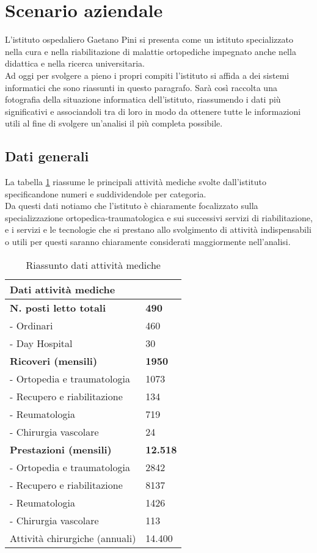 \newpage

\section{Scenario aziendale} \label{ref:scenario}
	L'istituto ospedaliero Gaetano Pini si presenta come un istituto specializzato nella cura e nella riabilitazione di malattie ortopediche impegnato anche nella didattica e nella ricerca universitaria. \\Ad oggi per svolgere a pieno i propri compiti l'istituto si affida a dei sistemi informatici che sono riassunti in questo paragrafo.
	Sarà così raccolta una fotografia della situazione informatica dell'istituto, riassumendo i dati più significativi e associandoli tra di loro in modo da ottenere tutte le informazioni utili al fine di svolgere un'analisi il più completa possibile.
	
	\subsection{Dati generali}
	La tabella \ref{tab:attivitaMediche} riassume le principali attività mediche svolte dall'istituto specificandone numeri e suddividendole per categoria. \\
	Da questi dati notiamo che l’istituto è chiaramente focalizzato sulla specializzazione ortopedica-traumatologica e sui successivi servizi di riabilitazione, e i servizi e le tecnologie che si prestano allo svolgimento di attività indispensabili o utili per questi saranno chiaramente considerati maggiormente nell'analisi. \\
	\begin{table}[h] 
		\centering
		\begin{tabular}{|l|l|}
			\hline
			\rowcolor[HTML]{EFEFEF} 
			\textbf{Dati attività mediche} & \\ \hline
			\textbf{N. posti letto totali}					& \textbf{490} \\
			- Ordinari 							& 460 \\
			- Day Hospital 					& 30 	\\ \hline
			\textbf{Ricoveri (mensili)}  				& \textbf{1950}			\\
			- Ortopedia e traumatologia   & 1073 \\
			- Recupero e riabilitazione 	& 134 \\
			- Reumatologia 						& 719 \\
			- Chirurgia vascolare  				& 24 \\ \hline
			\textbf{Prestazioni (mensili)}	  			& \textbf{12.518}		\\
			- Ortopedia e traumatologia   & 2842 \\
			- Recupero e riabilitazione 	& 8137 \\
			- Reumatologia 						& 1426 \\
			- Chirurgia vascolare  				& 113 \\ \hline
			Attività chirurgiche (annuali)  & 14.400		\\ \hline
		\end{tabular}
	\caption{Riassunto dati attività mediche}\label{tab:attivitaMediche}
	\end{table}

